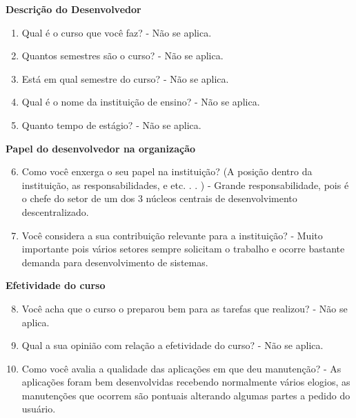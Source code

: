 \begin{anexosenv}
\textbf{Descrição do Desenvolvedor}

\begin{enumerate}
\item Qual é o curso que você faz?\newline
- Não se aplica.
\item Quantos semestres são o curso?\newline
- Não se aplica.
\item Está em qual semestre do curso?\newline
- Não se aplica.
\item Qual é o nome da instituição de ensino?\newline
- Não se aplica.
\item Quanto tempo de estágio?\newline
- Não se aplica.
\end{enumerate}

\textbf{Papel do desenvolvedor na organização}

\begin{enumerate}
\setcounter{enumi}{5}
\item Como você enxerga o seu papel na instituição? (A posição dentro da instituição, as
responsabilidades, e etc. . . )\newline
-  Grande responsabilidade, pois é o chefe do setor de um dos 3 núcleos centrais de desenvolvimento descentralizado.
\item Você considera a sua contribuição relevante para a instituição?\newline
- Muito importante pois vários setores sempre solicitam o trabalho e ocorre bastante demanda para desenvolvimento de sistemas.
\end{enumerate}

\textbf{Efetividade do curso}

\begin{enumerate}
\setcounter{enumi}{7}
\item Você acha que o curso o preparou bem para as tarefas que realizou?\newline
- Não se aplica.
\item Qual a sua opinião com relação a efetividade do curso?\newline
- Não se aplica.
\item Como você avalia a qualidade das aplicações em que deu manutenção?\newline
- As aplicações foram bem desenvolvidas recebendo normalmente vários elogios, as manutenções que ocorrem são pontuais alterando algumas partes a pedido do usuário.
\end{enumerate}


\end{anexosenv}
